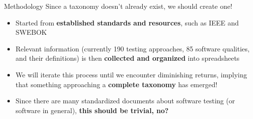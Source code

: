 \documentclass[22pt]{beamer}
\begin{document}
\begin{frame}[fragile]
\begin{textblock}{7.25}
        \begin{block}{\fontsize{37}{20}\selectfont Methodology}
            Since a taxonomy doesn't already exist, we should create one!
            \begin{itemize}
                \item Started from \textbf{established standards and resources},
                      such as IEEE \cite{IEEE2022, IEEE2017, IEEE2013} and
                      SWEBOK \cite{SWEBOK2024}
                \item Relevant information (currently 190 testing approaches,
                      85 software qualities, and their definitions) is then
                      \textbf{collected and organized} into spreadsheets
                \item We will iterate this process until we encounter
                      diminishing returns, implying that something approaching
                      a \textbf{complete taxonomy} has emerged!
                \item Since there are many standardized documents about
                      software testing (or software in general),
                      \textbf{this should be trivial, no?}
            \end{itemize}
            \vspace{5mm}
        \end{block}


\end{textblock}
\end{frame}
\end{document}
